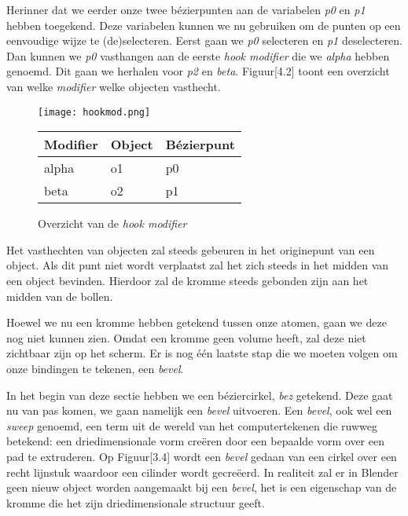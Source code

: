 

Herinner dat we eerder onze twee bézierpunten aan de variabelen \textit{p0} en \textit{p1} hebben toegekend. Deze variabelen kunnen we nu gebruiken om de punten op een eenvoudige wijze te (de)selecteren. Eerst gaan we \textit{p0} selecteren en \textit{p1} deselecteren. Dan kunnen we \textit{p0} vasthangen aan de eerste \textit{hook modifier} die we \textit{alpha} hebben genoemd. Dit gaan we herhalen voor \textit{p2} en \textit{beta}. Figuur[4.2] toont een overzicht van welke \textit{modifier} welke objecten vasthecht.  

\begin{figure}[h]
\texttt{[image: hookmod.png]}
\begin{tabular}{lll}
\hline
\multicolumn{1}{|l|}{Modifier} & \multicolumn{1}{l|}{Object} & \multicolumn{1}{l|}{Bézierpunt} \\ \hline
alpha                          & o1                          & p0                              \\
beta                           & o2                          & p1                             
\end{tabular}
\caption{Overzicht van de \textit{hook modifier}}
\end{figure}

Het vasthechten van objecten zal steeds gebeuren in het originepunt van een object. Als dit punt niet wordt verplaatst zal het zich steeds in het midden van een object bevinden. Hierdoor zal de kromme steeds gebonden zijn aan het midden van de bollen.
\par
Hoewel we nu een kromme hebben getekend tussen onze atomen, gaan we deze nog niet kunnen zien. Omdat een kromme geen volume heeft, zal deze niet zichtbaar zijn op het scherm. Er is nog één laatste stap die we moeten volgen om onze bindingen te tekenen, een \textit{bevel}.



In het begin van deze sectie hebben we een béziercirkel, \textit{bez} getekend. Deze gaat nu van pas komen, we gaan namelijk een \textit{bevel} uitvoeren. Een \textit{bevel}, ook wel een \textit{sweep} genoemd, een term uit de wereld van het computertekenen die ruwweg betekend: een driedimensionale vorm creëren door een bepaalde vorm over een pad te extruderen. Op Figuur[3.4] wordt een \textit{bevel} gedaan van een cirkel over een recht lijnstuk waardoor een cilinder wordt gecreëerd. In realiteit zal er in Blender geen nieuw object worden aangemaakt bij een \textit{bevel}, het is een eigenschap van de kromme die het zijn driedimensionale structuur geeft.  

